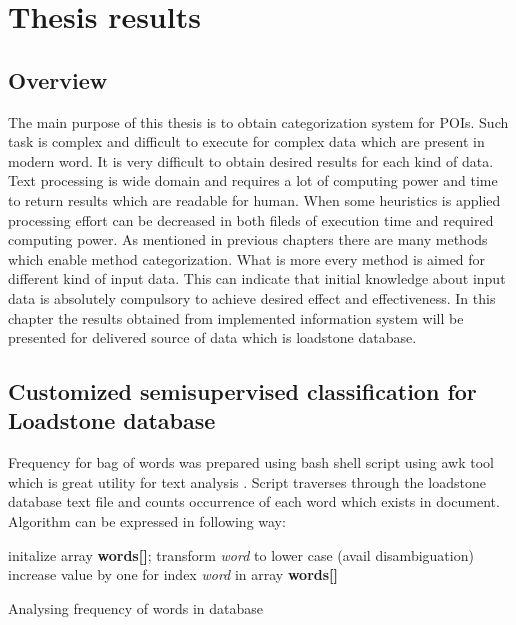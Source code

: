 \chapter{Thesis results}

\section{Overview}
The main purpose of this thesis is to obtain categorization system for POIs. Such task is complex and difficult to execute for complex data which are present in modern word. It is very difficult to obtain desired results for each kind of data. Text processing is wide domain and requires a lot of computing power and time to return results which are readable for human. When some heuristics is applied processing effort can be decreased in both fileds of execution time and required computing power. As mentioned in previous chapters there are many methods which enable method categorization. What is more every method is aimed for different kind of input data. This can indicate that initial knowledge about input data is absolutely compulsory to achieve desired effect and effectiveness. In this chapter the results obtained from implemented information system will be presented for delivered source of data which is loadstone database.

\section{Customized semisupervised classification for Loadstone database}
\label{analyze_db}
Frequency for bag of words was prepared using bash shell script using awk tool which is great utility for text analysis \cite{21}. Script traverses through the loadstone database text file and counts occurrence of each word which exists in document. Algorithm can be expressed in following way:
\begin{algorithm}[h]
	initalize array \textbf{words[]};
	\newline
	{
		transform \textit{word} to lower case (avail disambiguation)
		\newline
		increase value by one for index \textit{word} in array \textbf{words[]} 
	}
	\caption{Analysing frequency of words in database}
	\label{alg:analyze_freuency}
\end{algorithm}

